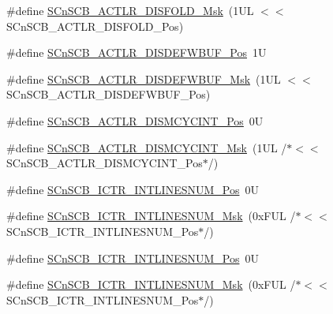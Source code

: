 \begin{DoxyCompactItemize}
\item 
\#define \mbox{\hyperlink{group___c_m_s_i_s___s_cn_s_c_b_gaa9dd2d4a2350499188f438d0aa9fd982}{S\+Cn\+S\+C\+B\+\_\+\+A\+C\+T\+L\+R\+\_\+\+D\+I\+S\+F\+O\+L\+D\+\_\+\+Msk}}~(1\+U\+L $<$$<$ S\+Cn\+S\+C\+B\+\_\+\+A\+C\+T\+L\+R\+\_\+\+D\+I\+S\+F\+O\+L\+D\+\_\+\+Pos)
\item 
\#define \mbox{\hyperlink{group___c_m_s_i_s___s_cn_s_c_b_gafa2eb37493c0f8dae77cde81ecf80f77}{S\+Cn\+S\+C\+B\+\_\+\+A\+C\+T\+L\+R\+\_\+\+D\+I\+S\+D\+E\+F\+W\+B\+U\+F\+\_\+\+Pos}}~1U
\item 
\#define \mbox{\hyperlink{group___c_m_s_i_s___s_cn_s_c_b_ga6cda7b7219232a008ec52cc8e89d5d08}{S\+Cn\+S\+C\+B\+\_\+\+A\+C\+T\+L\+R\+\_\+\+D\+I\+S\+D\+E\+F\+W\+B\+U\+F\+\_\+\+Msk}}~(1\+U\+L $<$$<$ S\+Cn\+S\+C\+B\+\_\+\+A\+C\+T\+L\+R\+\_\+\+D\+I\+S\+D\+E\+F\+W\+B\+U\+F\+\_\+\+Pos)
\item 
\#define \mbox{\hyperlink{group___c_m_s_i_s___s_cn_s_c_b_gaaa3e79f5ead4a32c0ea742b2a9ffc0cd}{S\+Cn\+S\+C\+B\+\_\+\+A\+C\+T\+L\+R\+\_\+\+D\+I\+S\+M\+C\+Y\+C\+I\+N\+T\+\_\+\+Pos}}~0U
\item 
\#define \mbox{\hyperlink{group___c_m_s_i_s___s_cn_s_c_b_ga2a2818f0489ad10b6ea2964e899d4cbc}{S\+Cn\+S\+C\+B\+\_\+\+A\+C\+T\+L\+R\+\_\+\+D\+I\+S\+M\+C\+Y\+C\+I\+N\+T\+\_\+\+Msk}}~(1\+U\+L /$\ast$$<$$<$ S\+Cn\+S\+C\+B\+\_\+\+A\+C\+T\+L\+R\+\_\+\+D\+I\+S\+M\+C\+Y\+C\+I\+N\+T\+\_\+\+Pos$\ast$/)
\item 
\#define \mbox{\hyperlink{group___c_m_s_i_s___s_cn_s_c_b_ga0777ddf379af50f9ca41d40573bfffc5}{S\+Cn\+S\+C\+B\+\_\+\+I\+C\+T\+R\+\_\+\+I\+N\+T\+L\+I\+N\+E\+S\+N\+U\+M\+\_\+\+Pos}}~0U
\item 
\#define \mbox{\hyperlink{group___c_m_s_i_s___s_cn_s_c_b_ga3efa0f5210051464e1034b19fc7b33c7}{S\+Cn\+S\+C\+B\+\_\+\+I\+C\+T\+R\+\_\+\+I\+N\+T\+L\+I\+N\+E\+S\+N\+U\+M\+\_\+\+Msk}}~(0x\+F\+U\+L /$\ast$$<$$<$ S\+Cn\+S\+C\+B\+\_\+\+I\+C\+T\+R\+\_\+\+I\+N\+T\+L\+I\+N\+E\+S\+N\+U\+M\+\_\+\+Pos$\ast$/)
\item 
\#define \mbox{\hyperlink{group___c_m_s_i_s___s_cn_s_c_b_ga0777ddf379af50f9ca41d40573bfffc5}{S\+Cn\+S\+C\+B\+\_\+\+I\+C\+T\+R\+\_\+\+I\+N\+T\+L\+I\+N\+E\+S\+N\+U\+M\+\_\+\+Pos}}~0U
\item 
\#define \mbox{\hyperlink{group___c_m_s_i_s___s_cn_s_c_b_ga3efa0f5210051464e1034b19fc7b33c7}{S\+Cn\+S\+C\+B\+\_\+\+I\+C\+T\+R\+\_\+\+I\+N\+T\+L\+I\+N\+E\+S\+N\+U\+M\+\_\+\+Msk}}~(0x\+F\+U\+L /$\ast$$<$$<$ S\+Cn\+S\+C\+B\+\_\+\+I\+C\+T\+R\+\_\+\+I\+N\+T\+L\+I\+N\+E\+S\+N\+U\+M\+\_\+\+Pos$\ast$/)
\item 

\end{DoxyCompactItemize}
